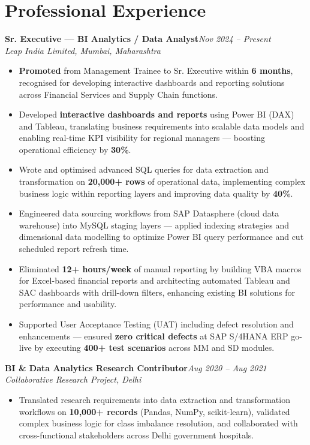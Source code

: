 \documentclass[10pt, letterpaper]{article}
\newcommand{\role}[3]{%
  \vspace{2pt}%
  {\bfseries #1}\hfill{\small\color{muted}\textit{#3}}\\[-2pt]%
  {\small\color{muted}\textit{#2}}%
}
\begin{document}
\section{Professional Experience}

\role{Sr. Executive — BI Analytics / Data Analyst}{Leap India Limited, Mumbai, Maharashtra}{Nov 2024 – Present}

\begin{itemize}
  \item \textbf{Promoted} from Management Trainee to Sr. Executive within \textbf{6 months}, recognised for developing interactive dashboards and reporting solutions across Financial Services and Supply Chain functions.
  \item Developed \textbf{interactive dashboards and reports} using Power BI (DAX) and Tableau, translating business requirements into scalable data models and enabling real-time KPI visibility for regional managers — boosting operational efficiency by \textbf{30\%}.
  \item Wrote and optimised advanced SQL queries for data extraction and transformation on \textbf{20,000+ rows} of operational data, implementing complex business logic within reporting layers and improving data quality by \textbf{40\%}.
  \item Engineered data sourcing workflows from SAP Datasphere (cloud data warehouse) into MySQL staging layers — applied indexing strategies and dimensional data modelling to optimize Power BI query performance and cut scheduled report refresh time.
  \item Eliminated \textbf{12+ hours/week} of manual reporting by building VBA macros for Excel-based financial reports and architecting automated Tableau and SAC dashboards with drill-down filters, enhancing existing BI solutions for performance and usability.
  \item Supported User Acceptance Testing (UAT) including defect resolution and enhancements — ensured \textbf{zero critical defects} at SAP S/4HANA ERP go-live by executing \textbf{400+ test scenarios} across MM and SD modules.
\end{itemize}

\vspace{1pt}

\role{BI \& Data Analytics Research Contributor}{Collaborative Research Project, Delhi}{Aug 2020 – Aug 2021}

\begin{itemize}
  \item Translated research requirements into data extraction and transformation workflows on \textbf{10,000+ records} (Pandas, NumPy, scikit-learn), validated complex business logic for class imbalance resolution, and collaborated with cross-functional stakeholders across Delhi government hospitals.
\end{itemize}
\end{document}
